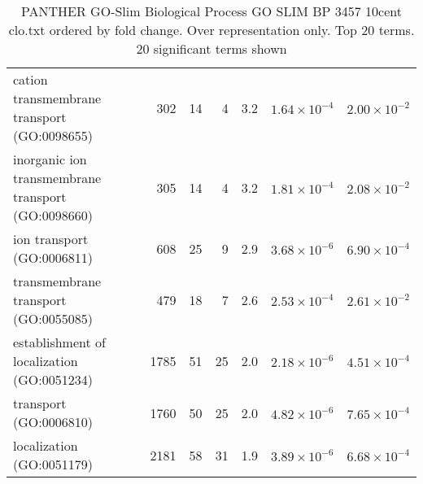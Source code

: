 \begin{table}[ht]
\begin{adjustbox}{width=\textwidth}
\begin{tabular}{lrrrrrr}
  cation transmembrane transport (GO:0098655) & 302 & 14 & 4 & 3.2 & $1.64 \times 10^{-4}$ & $2.00 \times 10^{-2}$ \\ 
  inorganic ion transmembrane transport (GO:0098660) & 305 & 14 & 4 & 3.2 & $1.81 \times 10^{-4}$ & $2.08 \times 10^{-2}$ \\ 
  ion transport (GO:0006811) & 608 & 25 & 9 & 2.9 & $3.68 \times 10^{-6}$ & $6.90 \times 10^{-4}$ \\ 
  transmembrane transport (GO:0055085) & 479 & 18 & 7 & 2.6 & $2.53 \times 10^{-4}$ & $2.61 \times 10^{-2}$ \\ 
  establishment of localization (GO:0051234) & 1785 & 51 & 25 & 2.0 & $2.18 \times 10^{-6}$ & $4.51 \times 10^{-4}$ \\ 
  transport (GO:0006810) & 1760 & 50 & 25 & 2.0 & $4.82 \times 10^{-6}$ & $7.65 \times 10^{-4}$ \\ 
  localization (GO:0051179) & 2181 & 58 & 31 & 1.9 & $3.89 \times 10^{-6}$ & $6.68 \times 10^{-4}$ \\ 
   \hline
\end{tabular}
\end{adjustbox}
\caption{PANTHER GO-Slim Biological Process GO SLIM BP 3457 10cent clo.txt ordered by fold change. Over representation only. Top 20 terms. 20 significant terms shown} 
\label{tab:PANTHER GO-Slim Biological Process GO SLIM BP 3457 10cent clo.txt ordered by fold change. Over representation only. Top 20 terms. 20 significant terms shown}
\end{table}



